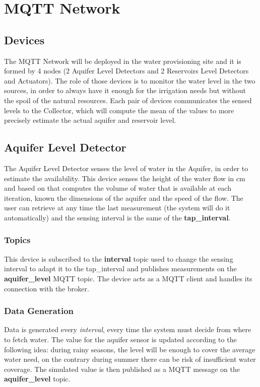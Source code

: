\section{MQTT Network}

\subsection{Devices}
The MQTT Network will be deployed in the water provisioning site and it is formed by 4 nodes (2 Aquifer Level Detectors and 2 Reservoirs Level Detectors and Actuators). The role of those devices is to monitor the water level in the two sources, in order to always have it enough for the irrigation needs but without the spoil of the natural resources. Each pair of devices communicates the sensed levels  to the Collector, which will compute the mean of the values to more precisely estimate the actual aquifer and reservoir level.


\subsection{Aquifer Level Detector}
The Aquifer Level Detector senses the level of water in the Aquifer, in order to estimate the availability. This device senses the height of the water flow in cm and based on that computes the volume of water that is available at each iteration, known the dimensions of the aquifer and the speed of the flow. The user can retrieve at any time the last measurement (the system will do it automatically) and the sensing interval is the same of the \textbf{tap\_interval}.

\subsubsection{Topics}
This device is subscribed to the \textbf{interval} topic used to change the sensing interval to adapt it to the tap\_interval and publishes measurements on the \textbf{aquifer\_level} MQTT topic.
The device acts as a MQTT client and handles its connection with the broker.

\subsubsection{Data Generation}
Data is generated every \textit{interval}, every time the system must decide from where to fetch water. The value for the aquifer sensor is updated according to the following idea: during rainy seasons, the level will be enough to cover the average water need, on the contrary during summer there can be risk of insufficient water coverage. The simulated value is then published as a MQTT message on the \textbf{aquifer\_level} topic.

